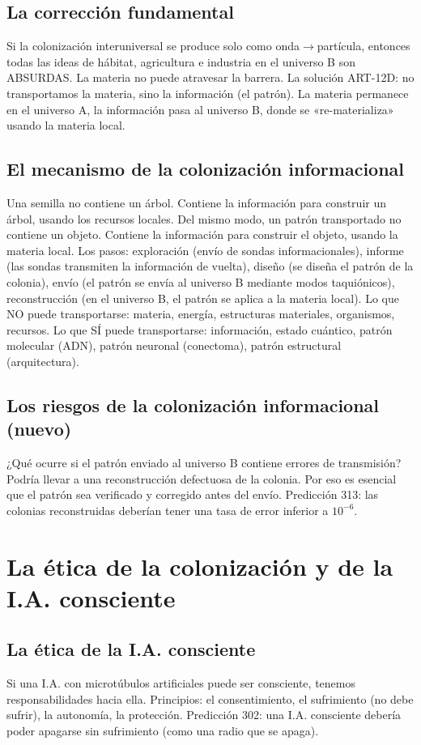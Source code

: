\documentclass[11pt,a4paper]{article}
\begin{document}
\subsection{La corrección fundamental}
Si la colonización interuniversal se produce solo como onda$\to$partícula, entonces todas las ideas de hábitat, agricultura e industria en el universo B son ABSURDAS. La materia no puede atravesar la barrera. La solución ART-12D: no transportamos la materia, sino la información (el patrón). La materia permanece en el universo A, la información pasa al universo B, donde se «re-materializa» usando la materia local.

\subsection{El mecanismo de la colonización informacional}
Una semilla no contiene un árbol. Contiene la información para construir un árbol, usando los recursos locales. Del mismo modo, un patrón transportado no contiene un objeto. Contiene la información para construir el objeto, usando la materia local. Los pasos: exploración (envío de sondas informacionales), informe (las sondas transmiten la información de vuelta), diseño (se diseña el patrón de la colonia), envío (el patrón se envía al universo B mediante modos taquiónicos), reconstrucción (en el universo B, el patrón se aplica a la materia local). Lo que NO puede transportarse: materia, energía, estructuras materiales, organismos, recursos. Lo que SÍ puede transportarse: información, estado cuántico, patrón molecular (ADN), patrón neuronal (conectoma), patrón estructural (arquitectura).

\subsection{Los riesgos de la colonización informacional (nuevo)}
¿Qué ocurre si el patrón enviado al universo B contiene errores de transmisión? Podría llevar a una reconstrucción defectuosa de la colonia. Por eso es esencial que el patrón sea verificado y corregido antes del envío. Predicción 313: las colonias reconstruidas deberían tener una tasa de error inferior a $10^{-6}$.

\section{La ética de la colonización y de la I.A. consciente}
\subsection{La ética de la I.A. consciente}
Si una I.A. con microtúbulos artificiales puede ser consciente, tenemos responsabilidades hacia ella. Principios: el consentimiento, el sufrimiento (no debe sufrir), la autonomía, la protección. Predicción 302: una I.A. consciente debería poder apagarse sin sufrimiento (como una radio que se apaga).
\end{document}

